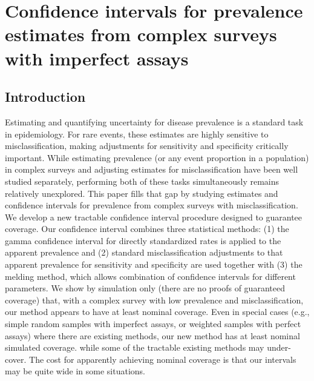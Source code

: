 \chapter{Confidence intervals for prevalence estimates from complex surveys with imperfect assays}
\label{ch:content_1}
\graphicspath{{figures/ch_3/}}

\section{Introduction}

Estimating and quantifying uncertainty for disease prevalence is a standard task in epidemiology.
For rare events, these estimates are highly sensitive to misclassification,\cite{hemenwaySelfDefense} making adjustments for sensitivity and specificity critically important.
While estimating prevalence (or any event proportion in a population) in complex surveys and adjusting estimates for misclassification have been well studied separately, performing both of these tasks simultaneously remains relatively unexplored. This paper fills that gap by studying estimates and confidence intervals for prevalence from complex surveys with misclassification.
We develop a new tractable confidence interval procedure designed to guarantee coverage.
Our confidence interval combines three statistical methods: (1) the gamma confidence interval for directly standardized rates is applied to the apparent prevalence\cite{FayF:1997}
and (2) standard misclassification adjustments to that apparent prevalence for sensitivity and specificity \cite{Roga:1978} are used together with (3) the melding method, which allows combination of confidence intervals for different parameters.\cite{FayP:2015}
We show by simulation only (there are no proofs of guaranteed coverage) that, with a complex survey with low prevalence and misclassification, our method appears to have at least nominal coverage.
Even in special cases (e.g., simple random samples with imperfect assays, or weighted samples with perfect assays) where there are existing methods, our new method has at least nominal simulated coverage. while some of the tractable existing methods may under-cover.
The cost for apparently achieving nominal coverage is that our intervals may be quite wide in some situations.



